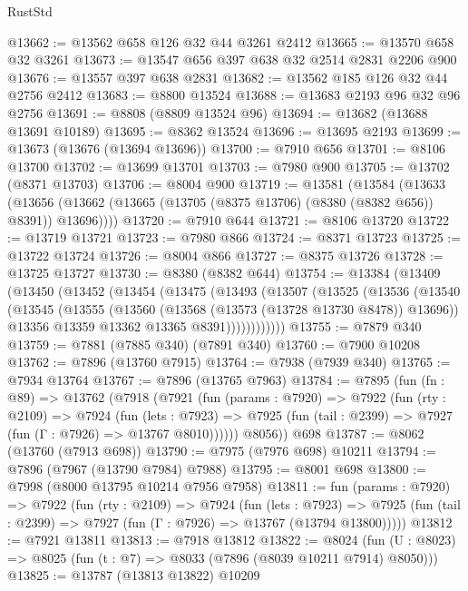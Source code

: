 \begin{lexlean}{RustStd}
\begin{coremodule}
{\begin{coremodule}
{{{{{{{{{{{{{{{{{{{{{{{{{{{{{{{{{{{{{{{{{{{{{{{{{{@13662 := @13562 @658 @126 @32 @44 @3261 @2412
@13665 := @13570 @658 @32 @3261
@13673 := @13547 @656 @397 @638 @32 @2514 @2831 @2206 @900
@13676 := @13557 @397 @638 @2831
@13682 := @13562 @185 @126 @32 @44 @2756 @2412
@13683 := @8800 @13524
@13688 := @13683 @2193 @96 @32 @96 @2756
@13691 := @8808 (@8809 @13524 @96)
@13694 := @13682 (@13688 @13691 @10189)
@13695 := @8362 @13524
@13696 := @13695 @2193
@13699 := @13673 (@13676 (@13694 @13696))
@13700 := @7910 @656
@13701 := @8106 @13700
@13702 := @13699 @13701
@13703 := @7980 @900
@13705 := @13702 (@8371 @13703)
@13706 := @8004 @900
@13719 := @13581
    (@13584
      (@13633 (@13656 (@13662 (@13665 (@13705 (@8375 @13706) (@8380 (@8382 @656)) @8391)) @13696))))
@13720 := @7910 @644
@13721 := @8106 @13720
@13722 := @13719 @13721
@13723 := @7980 @866
@13724 := @8371 @13723
@13725 := @13722 @13724
@13726 := @8004 @866
@13727 := @8375 @13726
@13728 := @13725 @13727
@13730 := @8380 (@8382 @644)
@13754 := @13384
    (@13409
      (@13450
        (@13452
          (@13454
            (@13475
              (@13493
                (@13507
                  (@13525
                    (@13536
                      (@13540
                        (@13545
                          (@13555
                            (@13560 (@13568 (@13573 (@13728 @13730 @8478)) @13696))
                            @13356
                            @13359
                            @13362
                            @13365
                            @8391))))))))))))
@13755 := @7879 @340
@13759 := @7881 (@7885 @340) (@7891 @340)
@13760 := @7900 @10208
@13762 := @7896 (@13760 @7915)
@13764 := @7938 (@7939 @340)
@13765 := @7934 @13764
@13767 := @7896 (@13765 @7963)
@13784 := @7895
    (fun (fn : @89) =>
    @13762
      (@7918
        (@7921
          (fun (params : @7920) =>
          @7922
            (fun (rty : @2109) =>
            @7924
              (fun (lets : @7923) =>
              @7925 (fun (tail : @2399) => @7927 (fun (Γ : @7926) => @13767 @8010))))))
        @8056))
    @698
@13787 := @8062 (@13760 (@7913 @698))
@13790 := @7975 (@7976 @698) @10211
@13794 := @7896 (@7967 (@13790 @7984) @7988)
@13795 := @8001 @698
@13800 := @7998 (@8000 @13795 @10214 @7956 @7958)
@13811 := fun (params : @7920) =>
  @7922
    (fun (rty : @2109) =>
    @7924
      (fun (lets : @7923) =>
      @7925 (fun (tail : @2399) => @7927 (fun (Γ : @7926) => @13767 (@13794 @13800)))))
@13812 := @7921 @13811
@13813 := @7918 @13812
@13822 := @8024
    (fun (U : @8023) => @8025 (fun (t : @7) => @8033 (@7896 (@8039 @10211 @7914) @8050)))
@13825 := @13787 (@13813 @13822) @10209
}}}}}}}}}}}}}}}}}}}}}}}}}}}}}}}}}}}}}}}}}}}}}}}}}}
\end{coremodule}}
\end{coremodule}
\end{lexlean}
